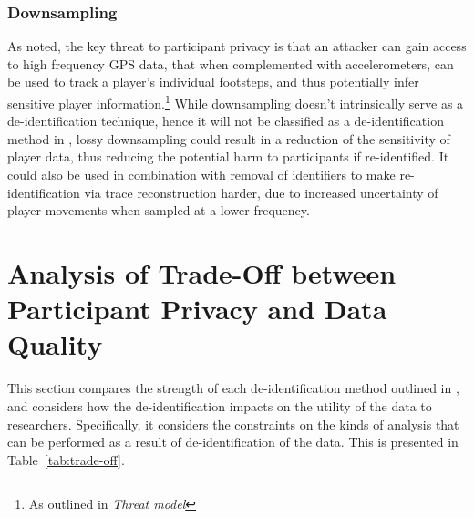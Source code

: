 \subsubsection{Downsampling}

As noted, the key threat to participant privacy is that an attacker can gain access to high frequency GPS data, that when complemented with accelerometers, can be used to track a player's individual footsteps, and thus potentially infer sensitive player information.\footnote{As outlined in \textit{Threat model} } While downsampling doesn't intrinsically serve as a de-identification technique, hence it will not be classified as a de-identification method in , lossy downsampling could result in a reduction of the sensitivity of player data, thus reducing the potential harm to participants if re-identified. It could also be used in combination with removal of identifiers to make re-identification via trace reconstruction harder, due to increased uncertainty of player movements when sampled at a lower frequency.

\section{Analysis of Trade-Off between Participant Privacy and Data Quality}
\label{sec:trade-off}

This section compares the strength of each de-identification method outlined in , and considers how the de-identification impacts on the utility of the data to researchers. Specifically, it considers the constraints on the kinds of analysis that can be performed as a result of de-identification of the data. This is presented in Table~\ref{tab:trade-off}.



